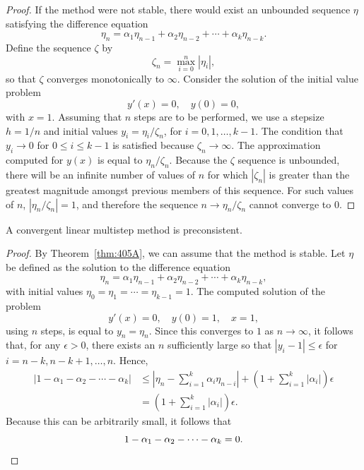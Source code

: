 \begin{proof}
If the method were not stable, there would exist an unbounded sequence $\eta$ satisfying the difference equation
\[
\eta_n = \alpha_1 \eta_{n-1} + \alpha_2 \eta_{n-2} + \cdots + \alpha_k \eta_{n-k}.
\]
Define the sequence $\zeta$ by
\[
\zeta_n = \max_{i=0}^n |\eta_i|,
\]
so that $\zeta$ converges monotonically to $\infty$. Consider the solution of the initial value problem
\[
y'(x) = 0, \quad y(0) = 0,
\]
with $x = 1$. Assuming that $n$ steps are to be performed, we use a stepsize $h = 1/n$ and initial values $y_i = \eta_i / \zeta_n$, for $i = 0, 1, \dots, k - 1$. The condition that $y_i \to 0$ for $0 \le i \le k - 1$ is satisfied because $\zeta_n \to \infty$. The approximation computed for $y(x)$ is equal to $\eta_n / \zeta_n$. Because the $\zeta$ sequence is unbounded, there will be an infinite number of values of $n$ for which $|\zeta_n|$ is greater than the greatest magnitude amongst previous members of this sequence. For such values of $n$, $|\eta_n / \zeta_n| = 1$, and therefore the sequence $n \to \eta_n / \zeta_n$ cannot converge to $0$.
\end{proof}

\begin{theorem}

  \label{thm:405B}
A convergent linear multistep method is preconsistent.
\end{theorem}

\begin{proof}
By Theorem~\ref{thm:405A}, we can assume that the method is stable. Let $\eta$ be defined as the solution to the difference equation
\[
\eta_n = \alpha_1 \eta_{n-1} + \alpha_2 \eta_{n-2} + \cdots + \alpha_k \eta_{n-k},
\]
with initial values $\eta_0 = \eta_1 = \cdots = \eta_{k-1} = 1$. The computed solution of the problem
\[
y'(x) = 0, \quad y(0) = 1, \quad x = 1,
\]
using $n$ steps, is equal to $y_n = \eta_n$. Since this converges to $1$ as $n \to \infty$, it follows that, for any $\epsilon > 0$, there exists an $n$ sufficiently large so that $|y_i - 1| \leq \epsilon$ for $i = n - k, n - k + 1, \dots, n$. Hence,
\[
\begin{aligned}
|1 - \alpha_1 - \alpha_2 - \cdots - \alpha_k| &\leq \left| \eta_n - \sum_{i=1}^k \alpha_i \eta_{n-i} \right| + \left( 1 + \sum_{i=1}^k |\alpha_i| \right) \epsilon \\
&= \left( 1 + \sum_{i=1}^k |\alpha_i| \right) \epsilon.
\end{aligned}
\]
Because this can be arbitrarily small, it follows that
\[
1 - \alpha_1 - \alpha_2 - \cdots - \alpha_k = 0. \qedhere
\]
\end{proof}

